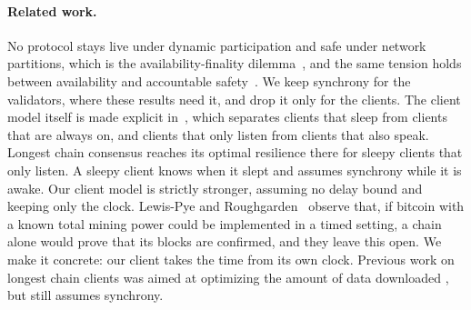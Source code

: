 \paragraph{Related work.}

No protocol stays live under dynamic participation and safe under network
partitions, which is the availability-finality dilemma~\cite{ebbflow}, and the
same tension holds between availability and accountable
safety~\cite{accountability}. We keep synchrony for the validators, where these
results need it, and drop it only for the clients. The client model itself is
made explicit in~\cite{cuamdr}, which separates clients that sleep from clients
that are always on, and clients that only listen from clients that also speak.
Longest chain consensus reaches its optimal resilience there for sleepy clients
that only listen. A sleepy client knows when it slept and assumes synchrony
while it is awake. Our client model is strictly stronger, assuming no delay
bound and keeping only the clock. Lewis-Pye and Roughgarden~\cite{lpr21}
observe that, if bitcoin with a known total mining power could be implemented in
a timed setting, a chain alone would prove that its blocks are confirmed, and
they leave this open. We make it concrete: our client takes the time from its
own clock. Previous work on longest chain clients was
aimed at optimizing the amount of data downloaded
\cite{nipopow,flyclient,blink}, but still assumes synchrony.

